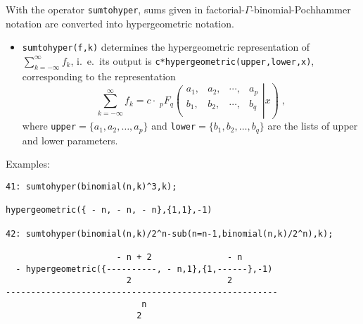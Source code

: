 With the operator {\tt sumtohyper}, sums given in
factorial-$\Gamma$-binomial-Poch\-hammer notation
are converted into hypergeometric notation.
\begin{itemize}
\item
{\tt sumtohyper(f,k)} determines the hypergeometric representation
of\linebreak
$\sum\limits_{k=-\infty}^\infty f_k$, i.\ e.\
its output is {\tt c*hypergeometric(upper,lower,x)}, corresponding to
the representation
\[
\sum\limits_{k=-\infty}^\infty f_k=c\cdot\;
_{p}F_{q}\left.\left(\begin{array}{cccc}
a_{1},&a_{2},&\cdots,&a_{p}\\
b_{1},&b_{2},&\cdots,&b_{q}\\
            \end{array}\right| x\right)
\;,
\]
where {\tt upper}$=\{a_{1}, a_{2}, \ldots, a_{p}\}$
and {\tt lower}$=\{b_{1}, b_{2}, \ldots, b_{q}\}$
are the lists of upper and lower parameters.
\end{itemize}
Examples:

{\small
\begin{verbatim}
41: sumtohyper(binomial(n,k)^3,k);

hypergeometric({ - n, - n, - n},{1,1},-1)

42: sumtohyper(binomial(n,k)/2^n-sub(n=n-1,binomial(n,k)/2^n),k);

                      - n + 2               - n
  - hypergeometric({----------, - n,1},{1,------},-1)
                        2                   2
------------------------------------------------------
                           n
                          2
\end{verbatim}
}\noindent


